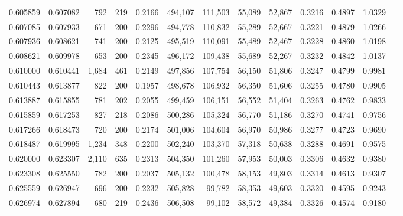 \begin{tabular}{rrrrrrrrrrrrr}
0.605859 & 0.607082 &   792 & 219 &                                     0.2166 & 494,107 & 111,503 &  55,089 &  52,867 & 0.3216 & 0.4897 & 1.0329 \\
0.607085 & 0.607933 &   671 & 200 &                                     0.2296 & 494,778 & 110,832 &  55,289 &  52,667 & 0.3221 & 0.4879 & 1.0266 \\
0.607936 & 0.608621 &   741 & 200 &                                     0.2125 & 495,519 & 110,091 &  55,489 &  52,467 & 0.3228 & 0.4860 & 1.0198 \\
0.608621 & 0.609978 &   653 & 200 &                                     0.2345 & 496,172 & 109,438 &  55,689 &  52,267 & 0.3232 & 0.4842 & 1.0137 \\
0.610000 & 0.610441 & 1,684 & 461 &                                     0.2149 & 497,856 & 107,754 &  56,150 &  51,806 & 0.3247 & 0.4799 & 0.9981 \\
0.610443 & 0.613877 &   822 & 200 &                                     0.1957 & 498,678 & 106,932 &  56,350 &  51,606 & 0.3255 & 0.4780 & 0.9905 \\
0.613887 & 0.615855 &   781 & 202 &                                     0.2055 & 499,459 & 106,151 &  56,552 &  51,404 & 0.3263 & 0.4762 & 0.9833 \\
0.615859 & 0.617253 &   827 & 218 &                                     0.2086 & 500,286 & 105,324 &  56,770 &  51,186 & 0.3270 & 0.4741 & 0.9756 \\
0.617266 & 0.618473 &   720 & 200 &                                     0.2174 & 501,006 & 104,604 &  56,970 &  50,986 & 0.3277 & 0.4723 & 0.9690 \\
0.618487 & 0.619995 & 1,234 & 348 &                                     0.2200 & 502,240 & 103,370 &  57,318 &  50,638 & 0.3288 & 0.4691 & 0.9575 \\
0.620000 & 0.623307 & 2,110 & 635 &                                     0.2313 & 504,350 & 101,260 &  57,953 &  50,003 & 0.3306 & 0.4632 & 0.9380 \\
0.623308 & 0.625550 &   782 & 200 &                                     0.2037 & 505,132 & 100,478 &  58,153 &  49,803 & 0.3314 & 0.4613 & 0.9307 \\
0.625559 & 0.626947 &   696 & 200 &                                     0.2232 & 505,828 &  99,782 &  58,353 &  49,603 & 0.3320 & 0.4595 & 0.9243 \\
0.626974 & 0.627894 &   680 & 219 &                                     0.2436 & 506,508 &  99,102 &  58,572 &  49,384 & 0.3326 & 0.4574 & 0.9180 \\

\end{tabular}
